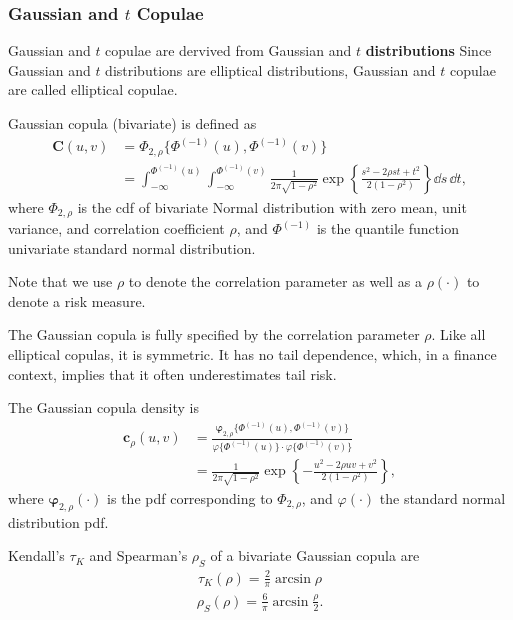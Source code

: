 \subsubsection{Gaussian and $t$ Copulae}\label{sec:ellpitical-copulae}

Gaussian and $t$ copulae are dervived from Gaussian and $t$ \textbf{distributions}
Since Gaussian and $t$ distributions are elliptical distributions, Gaussian and $t$ copulae are called elliptical copulae.

Gaussian copula (bivariate) is defined as
\begin{align}
  \bm{C}(u,v) &= \Phi_{2, \rho}\{\Phi^{(-1)}(u), \Phi^{(-1)}(v)\} \nonumber \\
              &= \int_{-\infty}^{\Phi^{(-1)}(u)}
                \int_{-\infty}^{\Phi^{(-1)}(v)}
                \frac{1}{2\pi\sqrt{1-\rho^2}}
                \exp{\left\{
                \frac{s^2-2\rho st+t^2}{2(1-\rho^2)}
                \right\}} \dd s\, \dd t,
\end{align}
where $\Phi_{2, \rho}$ is the cdf of bivariate Normal distribution
with zero mean, unit variance, and correlation coefficient $\rho$, and
$\Phi^{(-1)}$ is the quantile function univariate standard normal
distribution. \medskip

Note that we use $\rho$ to denote the correlation parameter as well as a $\rho(\cdot)$ to denote a risk measure. \medskip

The Gaussian copula is fully specified by the correlation parameter $\rho$.
Like all elliptical copulas, it is symmetric.
It has no tail dependence, which, in a finance context, implies that it often underestimates tail risk. \medskip

The Gaussian copula density is
\begin{align}
  \bm{c}_\rho(u,v) &= \frac{\bm{\varphi}_{2,\rho}\{\Phi^{(-1)}(u), \Phi^{(-1)}(v)\}}
                     {\varphi\{\Phi^{(-1)}(u)\} \cdot \varphi\{\Phi^{(-1)}(v)\}} \nonumber \\[10pt]
                   &= \frac{1}{2\pi\sqrt{1-\rho^2}}\exp\left\{
                     -\frac{u^2 - 2\rho uv + v^2}{2(1-\rho^2)}
                     \right\},
\end{align}
where $\bm{\varphi}_{2,\rho}(\cdot)$ is the pdf corresponding to
$\Phi_{2, \rho}$, and $\varphi(\cdot)$ the standard normal
distribution pdf. \medskip

Kendall's $\tau_K$ and Spearman's $\rho_S$ of a bivariate Gaussian copula are
    \begin{align}
        \tau_K(\rho) = \frac{2}{\pi}\arcsin\rho
        \end{align}
    \begin{align}
        \rho_S(\rho) = \frac{6}{\pi}\arcsin\frac{\rho}{2}.
        \end{align}

